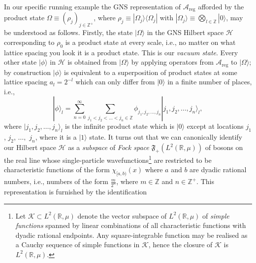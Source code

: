\documentclass[11pt]{amsart}
\theoremstyle{plain}%
\theoremstyle{definition}
\theoremstyle{remark}
\begin{document}
In our specific running example the GNS representation of $\mathcal{A}_{\text{reg}}$ afforded by the product state  $\Omega \equiv (\rho_j)_{j\in \mathbb{Z}^+}$, where $\rho_j \equiv |\Omega_j\rangle\langle \Omega_j|$ with $|\Omega_j\rangle \equiv \bigotimes_{l\in \mathbb{Z}} |0\rangle$, may be understood as follows. Firstly, the state  $|\Omega\rangle$ in the GNS Hilbert space $\mathcal{H}$ corresponding to $\rho_0$ is a product state at every scale, i.e., no matter on what lattice spacing you look it is a product state. This is our \emph{vacuum state}. Every other state $|\phi\rangle$ in $\mathcal{H}$ is obtained from $|\Omega\rangle$ by applying operators from $\mathcal{A}_{\text{reg}}$ to $|\Omega\rangle$; by construction $|\phi\rangle$ is equivalent to a superposition of product states at some lattice spacing $a_l = 2^{-l}$ which can only differ from $|0\rangle$ in a finite number of places, i.e.,  
\begin{equation}
	|\phi\rangle_l = \sum_{n=0}^\infty\sum_{j_1 < j_2 < \ldots< j_n \in \mathbb{Z}} \phi_{j_1,j_2, \ldots, j_n}|j_1,j_2, \ldots, j_n\rangle_l,
\end{equation} 
where $|j_1,j_2, \ldots, j_n\rangle_l$ is the infinite product state which is $|0\rangle$ except at locations $j_1$, $j_2$, $\ldots,$ $j_n$, where it is a $|1\rangle$ state. 
It turns out that we can canonically identify our Hilbert space $\mathcal{H}$ as a \emph{subspace} of \emph{Fock space} $\mathfrak{F}_+(L^2(\mathbb{R}, \mu))$ of bosons on the real line whose single-particle wavefunctions\footnote{Let $\mathcal{K}\subset L^2(\mathbb{R}, \mu)$ denote the vector subspace of $L^2(\mathbb{R}, \mu)$ of \emph{simple functions} spanned by linear combinations of all characteristic functions with dyadic rational endpoints. Any square-integrable function may be realised as a Cauchy sequence of simple functions in $\mathcal{K}$, hence the closure of $\mathcal{K}$ is $L^2(\mathbb{R}, \mu)$.} are restricted to be characteristic functions of the form $\chi_{[a,b)}(x)$ where $a$ and $b$ are dyadic rational numbers, i.e., numbers of the form $\frac{m}{2^n}$, where $m\in \mathbb{Z}$ and $n\in \mathbb{Z}^{+}$. This representation is furnished by the identification
\end{document}
